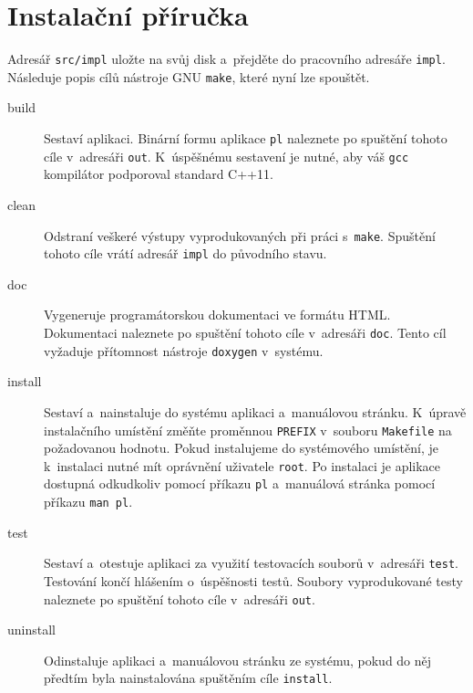 \documentclass[thesis=B,czech,hidelinks]{thesis}[2012/06/26]
\begin{document}
\chapter{Instalační příručka}

Adresář \texttt{src/impl} uložte na svůj disk a~přejděte do pracovního adresáře \texttt{impl}. Následuje popis cílů nástroje GNU \texttt{make}, které nyní lze spouštět.

\begin{description}
	\item[build] Sestaví aplikaci. Binární formu aplikace \texttt{pl} naleznete po spuštění tohoto cíle v~adresáři \texttt{out}. K~úspěšnému sestavení je nutné, aby váš \texttt{gcc} kompilátor podporoval standard C++11.
	\item[clean] Odstraní veškeré výstupy vyprodukovaných při práci s~\texttt{make}. Spuštění tohoto cíle vrátí adresář \texttt{impl} do původního stavu.
	\item[doc] Vygeneruje programátorskou dokumentaci ve formátu HTML. Dokumentaci naleznete po spuštění tohoto cíle v~adresáři \texttt{doc}. Tento cíl vyžaduje přítomnost nástroje \texttt{doxygen} v~systému.
	\item[install] Sestaví a~nainstaluje do systému aplikaci a~manuálovou stránku. K~úpravě instalačního umístění změňte proměnnou \texttt{PREFIX} v~souboru \texttt{Makefile} na požadovanou hodnotu. Pokud instalujeme do systémového umístění, je k~instalaci nutné mít oprávnění uživatele \texttt{root}. Po instalaci je aplikace dostupná odkudkoliv pomocí příkazu \texttt{pl} a~manuálová stránka pomocí příkazu \texttt{man pl}.
	\item[test] Sestaví a~otestuje aplikaci za využití testovacích souborů v~adresáři \texttt{test}. Testování končí hlášením o~úspěšnosti testů. Soubory vyprodukované testy naleznete po spuštění tohoto cíle v~adresáři \texttt{out}.
	\item[uninstall] Odinstaluje aplikaci a~manuálovou stránku ze systému, pokud do něj předtím byla nainstalována spuštěním cíle \texttt{install}. 
\end{description}
\end{document}
